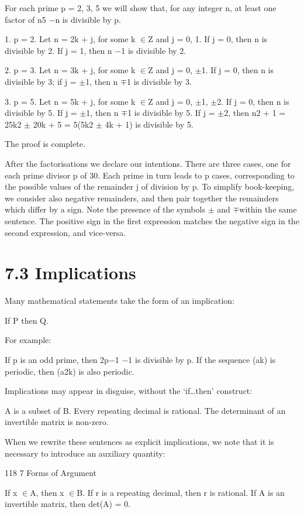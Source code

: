 \documentclass[11pt]{article}
\theoremstyle{plain}
\theoremstyle{definition}
\begin{document}
For each prime p = 2, 3, 5 we will show that, for any integer n, at least one factor of n5 $-$n is divisible by p.

1. p = 2. Let n = 2k + j, for some k $\in$Z and j = 0, 1. If j = 0, then n is divisible by 2. If j = 1, then n $-$1 is divisible by 2.

2. p = 3. Let n = 3k + j, for some k $\in$Z and j = 0, $\pm$1. If j = 0, then n is divisible by 3; if j = $\pm$1, then n $\mp$1 is divisible by 3.

3. p = 5. Let n = 5k + j, for some k $\in$Z and j = 0, $\pm$1, $\pm$2. If j = 0, then n is divisible by 5. If j = $\pm$1, then n $\mp$1 is divisible by 5. If j = $\pm$2, then n2 + 1 = 25k2 $\pm$ 20k + 5 = 5(5k2 $\pm$ 4k + 1) is divisible by 5.

The proof is complete. 

After the factorisations we declare our intentions. There are three cases, one for each prime divisor p of 30. Each prime in turn leads to p cases, corresponding to the possible values of the remainder j of division by p. To simplify book-keeping, we consider also negative remainders, and then pair together the remainders which differ by a sign. Note the presence of the symbols $\pm$ and $\mp$within the same sentence. The positive sign in the first expression matches the negative sign in the second expression, and vice-versa.

\section{7.3 Implications}

Many mathematical statements take the form of an implication:

If P then Q.

For example:

If p is an odd prime, then 2p$-$1 $-$1 is divisible by p. If the sequence (ak) is periodic, then (a2k) is also periodic.

Implications may appear in disguise, without the `if\dots{}then' construct:

A is a subset of B. Every repeating decimal is rational. The determinant of an invertible matrix is non-zero.

When we rewrite these sentences as explicit implications, we note that it is necessary to introduce an auxiliary quantity:

118 7 Forms of Argument

If x $\in$A, then x $\in$B. If r is a repeating decimal, then r is rational. If A is an invertible matrix, then det(A) = 0.
\end{document}
